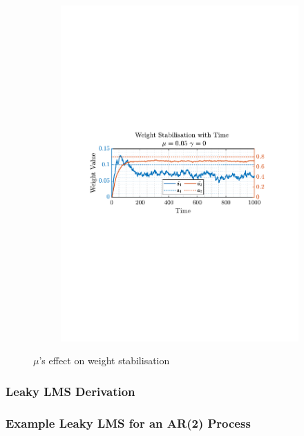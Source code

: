 \documentclass[12pt]{article}
\begin{document}
\begin{figure}[H]
\begin{subfigure}{0.49\textwidth}
					\includegraphics[trim={2.2cm 11.2cm 3.00cm  11.2cm}, clip, width=\textwidth]{../MATLAB/figures/q2_1cd_fig03.pdf} 
					\captionsetup{justification=centering}
				\end{subfigure}
				\captionsetup{justification=centering}
				\caption{$\mu$'s effect on weight stabilisation}
				\label{fig: 2-1d}
			\end{figure}
		\subsubsection{Leaky LMS Derivation}
		\subsubsection{Example Leaky LMS for an AR(2) Process}  
		
\end{document}
